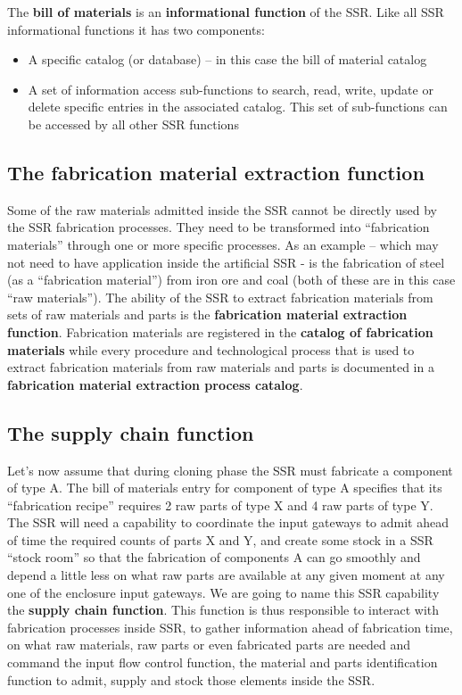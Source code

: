 \bigskip

The \textbf{bill of materials} is an \textbf{informational function} of
the SSR. Like all SSR informational functions it has two components:


\bigskip

\begin{itemize}
\item A specific catalog (or database) – in this case the bill of
material catalog
\item A set of information access sub-functions to search, read, write,
update or delete specific entries in the associated catalog. This set
of sub-functions can be accessed by all other SSR functions 
\end{itemize}
\subsection[The fabrication material extraction function ]{The
fabrication material extraction function }
\hypertarget{RefHeading3064306210128}{}Some of the raw materials
admitted inside the SSR cannot be directly used by the SSR fabrication
processes. They need to be transformed into “fabrication materials”
through one or more specific processes. As an example – which may not
need to have application inside the artificial SSR - is the fabrication
of steel (as a “fabrication material”) from iron ore and coal (both of
these are in this case “raw materials”). The ability of the SSR to
extract fabrication materials from sets of raw materials and parts is
the \textbf{fabrication material extraction function}.  Fabrication
materials are registered in the \textbf{catalog of fabrication
materials }while every procedure and technological process that is used
to extract fabrication materials from raw materials and parts is
documented in a \textbf{fabrication material extraction process
catalog}.


\bigskip

\subsection[The supply chain function]{The supply chain function}
\hypertarget{RefHeading3066306210128}{}Let’s now assume that during
cloning phase the SSR must fabricate a component of type A.  The bill
of materials entry for component of type A specifies that its
“fabrication recipe” requires 2 raw parts of type X and 4 raw parts of
type Y.  The SSR will need a capability to coordinate the input
gateways to admit ahead of time the required counts of parts X and Y,
and create some stock in a SSR “stock room” so that the fabrication of
components A can go smoothly and depend a little less on what raw parts
are available at any given moment at any one of the enclosure input
gateways. We are going to name this SSR capability the \textbf{supply
chain function}. This function is thus responsible to interact with
fabrication processes inside SSR, to gather information ahead of
fabrication time, on what raw materials, raw parts or even fabricated
parts are needed and command the input flow control function, the
material and parts identification function to admit, supply and stock
those elements inside the SSR.


